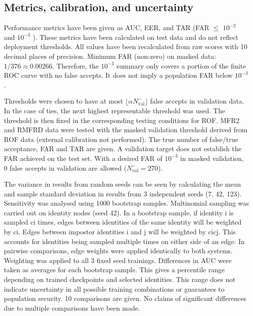 \documentclass[10pt,lettersize,journal]{IEEEtran}
\begin{document}
\subsection{Metrics, calibration, and uncertainty}
Performance metrics have been given as AUC, EER, and TAR (FAR \ensuremath{\leq} \ensuremath{10^{-2}} and \ensuremath{10^{-3}} ). These metrics have been calculated on test data and do not reflect deployment thresholds. All values have been recalculated from raw scores with 10 decimal places of precision. Minimum FAR (non-zero) on masked data: \ensuremath{1/376\approx0.00266}. Therefore, the \ensuremath{10^{-3}} summary only covers a portion of the finite ROC curve with no false accepts. It does not imply a population FAR below \ensuremath{10^{-3}}.\par
Thresholds were chosen to have at most \ensuremath{\lfloor\alpha N_{\mathrm{val}}^{-}\rfloor} false accepts in validation data. In the case of ties, the next highest representable threshold was used. The threshold is then fixed in the corresponding testing conditions for ROF. MFR2 and RMFRD data were tested with the masked validation threshold derived from ROF data (external calibration not performed). The true number of false/true acceptance, FAR and TAR are given. A validation target does not establish the FAR achieved on the test set. With a desired FAR of \ensuremath{10^{-3}} in masked validation, 0 false accepts in validation are allowed (\ensuremath{N_{\mathrm{val}}^{-}=270}).\par
The variance in results from random seeds can be seen by calculating the mean and sample standard deviation in results from 3 independent seeds (7, 42, 123). Sensitivity was analysed using 1000 bootstrap samples. Multinomial sampling was carried out on identity nodes (seed 42). In a bootstrap sample, if identity i is sampled ci times, edges between identities of the same identity will be weighted by ci. Edges between impostor identities i and j will be weighted by cicj. This accounts for identities being sampled multiple times on either side of an edge. In pairwise comparisons, edge weights were applied identically to both systems. Weighting was applied to all 3 fixed seed trainings. Differences in AUC were taken as averages for each bootstrap sample. This gives a percentile range depending on trained checkpoints and selected identities. This range does not indicate uncertainty in all possible training combinations or guarantees to population security. 10 comparisons are given. No claims of significant differences due to multiple comparisons have been made.\par
\end{document}
